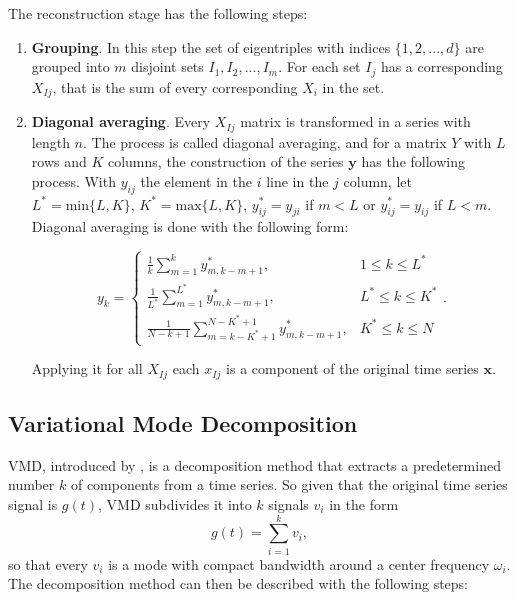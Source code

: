 The reconstruction stage has the following steps:

\begin{enumerate}
\item \textbf{Grouping}. In this step the set of eigentriples with indices $\{1,2,...,d\}$ are grouped into $m$ disjoint sets $I_{1},I_{2},...,I_{m}$. For each set $I_{j}$ has a corresponding $X_{Ij}$, that is the sum of every corresponding $X_{i}$ in the set.

\item \textbf{Diagonal averaging}. Every $X_{Ij}$ matrix is transformed in a series with length $n$. The process is called diagonal averaging, and for a matrix $Y$ with $L$ rows and $K$ columns, the construction of the series $\boldsymbol{y}$ has the following process. With $y_{ij}$ the element in the $i$ line in the $j$ column, let $L^{*}=\text{min}\{L,K\}$, $K^{*}=\text{max}\{L,K\}$, $y_{ij}^{*}=y_{ji}$ if $m<L$ or $y_{ij}^{*}=y_{ij}$ if $L<m$. Diagonal averaging is done with the following form:

\begin{equation}
y_{k}=\begin{cases}
\frac{1}{k}\sum_{m=1}^{k}y_{m,k-m+1}^{*}, & 1\le k\le L^{*}\\
\frac{1}{L^{*}}\sum_{m=1}^{L^{*}}y_{m,k-m+1}^{*}, & L^{*}\le k\le K^{*}\\
\frac{1}{N-k+1}\sum_{m=k-K^{*}+1}^{N-K^{*}+1}y_{m,k-m+1}^{*}, & K^{*} \le k\le N
\end{cases}.
\end{equation}

Applying it for all $X_{Ij}$ each $x_{Ij}$ is a component of the original time series $\boldsymbol{x}$.

\end{enumerate}

\subsection{Variational Mode Decomposition}
\ac{VMD}, introduced by , is a decomposition method that extracts a predetermined number $k$ of components from a time series. So given that the original time series signal is $g(t)$, \ac{VMD} subdivides it into $k$ signals $v_i$ in the form
%
\begin{equation}
    g(t) = \sum^{k}_{i=1} v_i,
\end{equation}
so that every $v_i$ is a mode with compact bandwidth around a center frequency $\omega_i$. The decomposition method can then be described with the following steps:

